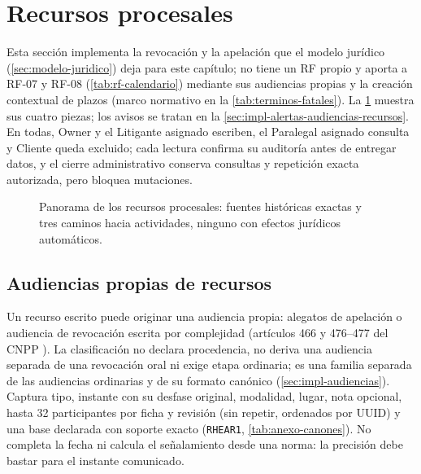 
\section{Recursos procesales}\label{sec:impl-recursos}

Esta sección implementa la revocación y la apelación que el modelo jurídico (\cref{sec:modelo-juridico}) deja para este capítulo; no tiene un RF propio y aporta a RF-07 y RF-08 (\cref{tab:rf-calendario}) mediante sus audiencias propias y la creación contextual de plazos (marco normativo en la \cref{tab:terminos-fatales}). La \cref{fig:impl-rec-panorama} muestra sus cuatro piezas; los avisos se tratan en la \cref{sec:impl-alertas-audiencias-recursos}. En todas, Owner y el Litigante asignado escriben, el Paralegal asignado consulta y Cliente queda excluido; cada lectura confirma su auditoría antes de entregar datos, y el cierre administrativo conserva consultas y repetición exacta autorizada, pero bloquea mutaciones.

\begin{figure}[!htbp]
  \centering
  
  \caption{Panorama de los recursos procesales: fuentes históricas exactas y tres caminos hacia actividades, ninguno con efectos jurídicos automáticos.}
  \label{fig:impl-rec-panorama}
\end{figure}





\subsection{Audiencias propias de recursos}\label{sec:impl-audiencias-recursos}

Un recurso escrito puede originar una audiencia propia: alegatos de apelación o audiencia de revocación escrita por complejidad (artículos 466 y 476--477 del CNPP \cite{cnpp_consolidado2025}). La clasificación no declara procedencia, no deriva una audiencia separada de una revocación oral ni exige etapa ordinaria; es una familia separada de las audiencias ordinarias y de su formato canónico (\cref{sec:impl-audiencias}). Captura tipo, instante con su desfase original, modalidad, lugar, nota opcional, hasta 32 participantes por ficha y revisión (sin repetir, ordenados por UUID) y una base declarada con soporte exacto (\texttt{RHEAR1}, \cref{tab:anexo-canones}). No completa la fecha ni calcula el señalamiento desde una norma: la precisión debe bastar para el instante comunicado.

